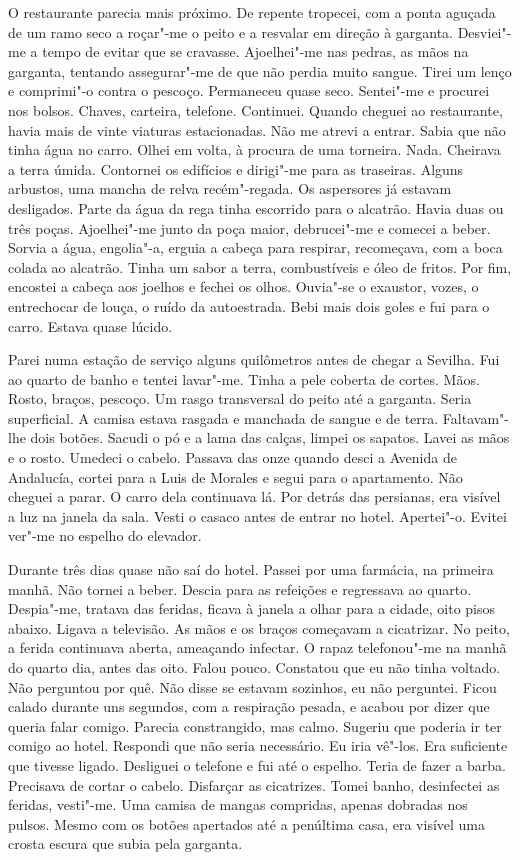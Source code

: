 O restaurante parecia mais próximo. De repente tropecei, com a ponta
aguçada de um ramo seco a roçar"-me o peito e a resvalar em direção à
garganta. Desviei"-me a tempo de evitar que se cravasse. Ajoelhei"-me
nas pedras, as mãos na garganta, tentando assegurar"-me de que não
perdia muito sangue. Tirei um lenço e comprimi"-o contra o pescoço.
Permaneceu quase seco. Sentei"-me e procurei nos bolsos. Chaves,
carteira, telefone. Continuei. Quando cheguei ao restaurante, havia mais
de vinte viaturas estacionadas. Não me atrevi a entrar. Sabia que não
tinha água no carro. Olhei em volta, à procura de uma torneira. Nada.
Cheirava a terra úmida. Contornei os edifícios e dirigi"-me para as
traseiras. Alguns arbustos, uma mancha de relva recém"-regada. Os
aspersores já estavam desligados. Parte da água da rega tinha escorrido
para o alcatrão. Havia duas ou três poças. Ajoelhei"-me junto da poça
maior, debrucei"-me e comecei a beber. Sorvia a água, engolia"-a, erguia
a cabeça para respirar, recomeçava, com a boca colada ao alcatrão. Tinha
um sabor a terra, combustíveis e óleo de fritos. Por fim, encostei a
cabeça aos joelhos e fechei os olhos. Ouvia"-se o exaustor, vozes, o
entrechocar de louça, o ruído da autoestrada. Bebi mais dois goles e
fui para o carro. Estava quase lúcido.

Parei numa estação de serviço alguns quilômetros antes de chegar a
Sevilha. Fui ao quarto de banho e tentei lavar"-me. Tinha a pele coberta
de cortes. Mãos. Rosto, braços, pescoço. Um rasgo transversal do peito
até a garganta. Seria superficial. A camisa estava rasgada e manchada de
sangue e de terra. Faltavam"-lhe dois botões. Sacudi o pó e a lama das
calças, limpei os sapatos. Lavei as mãos e o rosto. Umedeci o cabelo.
Passava das onze quando desci a Avenida de Andalucía, cortei para a Luis
de Morales e segui para o apartamento. Não cheguei a parar. O carro dela
continuava lá. Por detrás das persianas, era visível a luz na janela da
sala. Vesti o casaco antes de entrar no hotel. Apertei"-o. Evitei
ver"-me no espelho do elevador.

Durante três dias quase não saí do hotel. Passei por uma farmácia, na
primeira manhã. Não tornei a beber. Descia para as refeições e
regressava ao quarto. Despia"-me, tratava das feridas, ficava à janela a
olhar para a cidade, oito pisos abaixo. Ligava a televisão. As mãos e os
braços começavam a cicatrizar. No peito, a ferida continuava aberta,
ameaçando infectar. O rapaz telefonou"-me na manhã do quarto dia, antes
das oito. Falou pouco. Constatou que eu não tinha voltado. Não perguntou
por quê. Não disse se estavam sozinhos, eu não perguntei. Ficou calado
durante uns segundos, com a respiração pesada, e acabou por dizer que
queria falar comigo. Parecia constrangido, mas calmo. Sugeriu que
poderia ir ter comigo ao hotel. Respondi que não seria necessário. Eu
iria vê"-los. Era suficiente que tivesse ligado. Desliguei o telefone e
fui até o espelho. Teria de fazer a barba. Precisava de cortar o
cabelo. Disfarçar as cicatrizes. Tomei banho, desinfectei as feridas,
vesti"-me. Uma camisa de mangas compridas, apenas dobradas nos pulsos.
Mesmo com os botões apertados até a penúltima casa, era visível uma
crosta escura que subia pela garganta.

